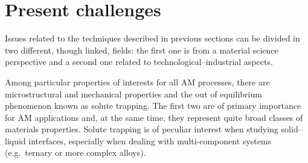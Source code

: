 %








\section{Present challenges}
\label{sec:challenges}
Issues related to the techniques described in previous sections can be divided in two different, though linked, fields: the first one is from a material science perspective and a second one related to technological--industrial aspects.



Among particular properties of interests for all AM processes, there are microstructural and mechanical properties and the out of equilibrium phenomenon known as solute trapping. The first two are of primary importance for AM applications and, at the same time, they represent quite broad classes of materials properties. Solute trapping is of peculiar interest when studying solid--liquid interfaces, especially when dealing with multi-component systems (e.g.\ ternary or more complex alloys).

